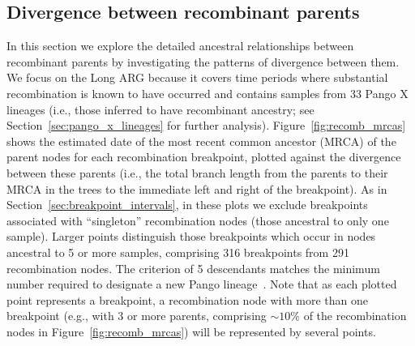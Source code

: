\documentclass{article}
\begin{document}
\subsection{Divergence between recombinant parents}
\label{sec:parent_divergence}
In this section we explore the detailed ancestral relationships between
recombinant parents by investigating the patterns of divergence between
them.
We focus on the Long ARG because it covers time
periods where substantial recombination is known to have occurred
and contains samples from 33 Pango X lineages (i.e., those inferred
to have recombinant ancestry; see Section~\ref{sec:pango_x_lineages} for
further analysis).
Figure~\ref{fig:recomb_mrcas} shows the estimated date of the most recent
common ancestor (MRCA) of the parent nodes for each recombination breakpoint,
plotted against the divergence between these parents (i.e., the
total branch length from the parents to their MRCA in the trees to
the immediate left and right of the breakpoint).
As in Section~\ref{sec:breakpoint_intervals}, in these plots we
exclude breakpoints associated with ``singleton'' recombination nodes
(those ancestral to only one sample).
Larger points distinguish those breakpoints which occur in nodes
ancestral to 5 or more samples, comprising 316 breakpoints from
291 recombination nodes. The criterion of 5 descendants matches the
minimum number required to designate a new Pango
lineage~\citep{Rambaut2020-dw}.
Note that as each plotted point represents a breakpoint, a recombination
node with more than one breakpoint (e.g., with 3 or more parents,
comprising ${\sim}10 \%$ of the
recombination nodes in
Figure~\ref{fig:recomb_mrcas}) will be represented by several points.
\end{document}
